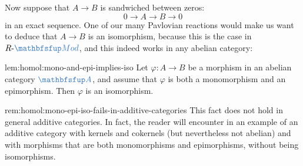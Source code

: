 Now suppose that $A \to B$ is sandwiched between zeros:
\[
  0 \to A \to B \to 0
\]
in an exact sequence. One of our many Pavlovian reactions would make
us want to deduce that $A \to B$ is an isomorphism, because this is
the case in $R\text{-}\categ{Mod}$, and this indeed works in any
abelian category:
\begin{lem}{}{lem:homol:mono-and-epi-implies-iso}
  Let $\varphi : A \to B$ be a morphism in an abelian category
  $\categ{A}$, and assume that $\varphi$ is both a monomorphism and an
  epimorphism. Then $\varphi$ is an isomorphism.
\end{lem}

\begin{rem}{}{rem:homol:mono-epi-iso-fails-in-additive-categories}
  This fact does not hold in general additive categories. In fact, the
  reader will encounter in
   an
  example of an additive category with kernels and cokernels (but
  nevertheless not abelian) and with morphisms that are both
  monomorphisms and epimorphisms, without being isomorphisms.
\end{rem}

